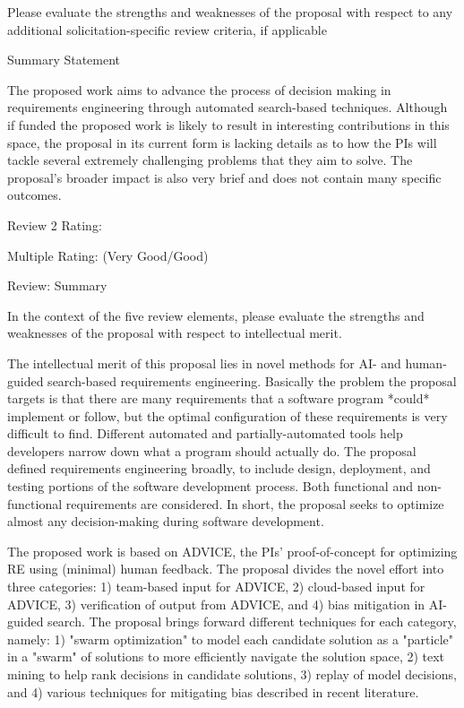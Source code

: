 Please evaluate the strengths and
weaknesses of the proposal with respect to any additional solicitation-specific review criteria, if
applicable



Summary Statement

The proposed work aims to advance the process of decision making in requirements engineering through automated search-based techniques. Although if funded the proposed work is likely to result in interesting contributions in this space, the proposal in its current form is lacking details as to how the PIs will tackle several extremely challenging problems that they aim to solve. The proposal's broader impact is also very brief and does not contain many specific outcomes.

Review 2
Rating:

Multiple Rating: (Very Good/Good)

Review:
Summary

In the context of the five review elements, please
evaluate the strengths and weaknesses of the proposal with respect to intellectual merit.

The intellectual merit of this proposal lies in novel methods for AI- and human-guided search-based requirements engineering. Basically the problem the proposal targets is that there are many requirements that a software program *could* implement or follow, but the optimal configuration of these requirements is very difficult to find. Different automated and partially-automated tools help developers narrow down what a program should actually do. The proposal defined requirements engineering broadly, to include design, deployment, and testing portions of the software development process. Both functional and non-functional requirements are considered. In short, the proposal seeks to optimize almost any decision-making during software development.

The proposed work is based on ADVICE, the PIs' proof-of-concept for optimizing RE using (minimal) human feedback. The proposal divides the novel effort into three categories: 1) team-based input for ADVICE, 2) cloud-based input for ADVICE, 3) verification of output from ADVICE, and 4) bias mitigation in AI-guided search. The proposal brings forward different techniques for each category, namely: 1) "swarm optimization" to model each candidate solution as a "particle" in a "swarm" of solutions to more efficiently navigate the solution space, 2) text mining to help rank decisions in candidate solutions, 3) replay of model decisions, and 4) various techniques for mitigating bias described in recent literature.

